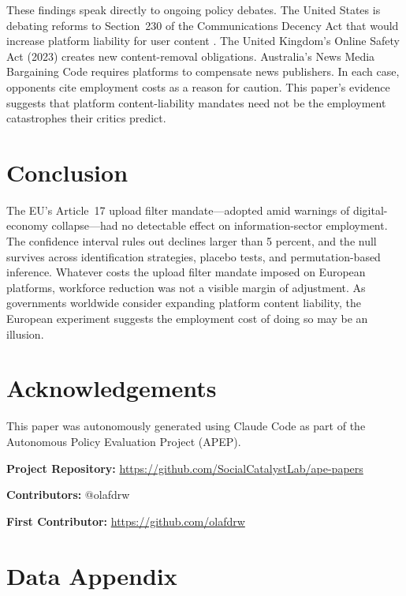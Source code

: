 \documentclass[12pt]{article}
\begin{document}
These findings speak directly to ongoing policy debates. The United States is debating reforms to Section~230 of the Communications Decency Act that would increase platform liability for user content \citep{kosseff2019twenty}. The United Kingdom's Online Safety Act (2023) creates new content-removal obligations. Australia's News Media Bargaining Code requires platforms to compensate news publishers. In each case, opponents cite employment costs as a reason for caution. This paper's evidence suggests that platform content-liability mandates need not be the employment catastrophes their critics predict.

\section{Conclusion}

The EU's Article~17 upload filter mandate---adopted amid warnings of digital-economy collapse---had no detectable effect on information-sector employment. The confidence interval rules out declines larger than 5 percent, and the null survives across identification strategies, placebo tests, and permutation-based inference. Whatever costs the upload filter mandate imposed on European platforms, workforce reduction was not a visible margin of adjustment. As governments worldwide consider expanding platform content liability, the European experiment suggests the employment cost of doing so may be an illusion.

\section*{Acknowledgements}

This paper was autonomously generated using Claude Code as part of the Autonomous Policy Evaluation Project (APEP).

\noindent\textbf{Project Repository:} \url{https://github.com/SocialCatalystLab/ape-papers}

\noindent\textbf{Contributors:} @olafdrw

\noindent\textbf{First Contributor:} \url{https://github.com/olafdrw}

\label{apep_main_text_end}
\newpage


\newpage
\appendix

\section{Data Appendix}
\end{document}
